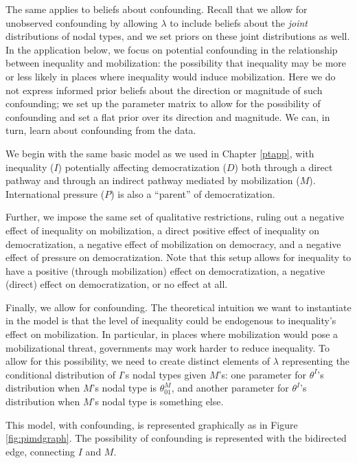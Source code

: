 \documentclass[
  12pt,
]{book}
\begin{document}
The same applies to beliefs about confounding. Recall that we allow for unobserved confounding by allowing \(\lambda\) to include beliefs about the \emph{joint} distributions of nodal types, and we set priors on these joint distributions as well. In the application below, we focus on potential confounding in the relationship between inequality and mobilization: the possibility that inequality may be more or less likely in places where inequality would induce mobilization. Here we do not express informed prior beliefs about the direction or magnitude of such confounding; we set up the parameter matrix to allow for the possibility of confounding and set a flat prior over its direction and magnitude. We can, in turn, learn about confounding from the data.

We begin with the same basic model as we used in Chapter \ref{ptapp}, with inequality (\(I\)) potentially affecting democratization (\(D\)) both through a direct pathway and through an indirect pathway mediated by mobilization (\(M\)). International pressure (\(P\)) is also a ``parent'' of democratization.

Further, we impose the same set of qualitative restrictions, ruling out a negative effect of inequality on mobilization, a direct positive effect of inequality on democratization, a negative effect of mobilization on democracy, and a negative effect of pressure on democratization. Note that this setup allows for inequality to have a positive (through mobilization) effect on democratization, a negative (direct) effect on democratization, or no effect at all.

Finally, we allow for confounding. The theoretical intuition we want to instantiate in the model is that the level of inequality could be endogenous to inequality's effect on mobilization. In particular, in places where mobilization would pose a mobilizational threat, governments may work harder to reduce inequality. To allow for this possibility, we need to create distinct elements of \(\lambda\) representing the conditional distribution of \(I\)'s nodal types given \(M\)'s: one parameter for \(\theta^I\)'s distribution when \(M\)'s nodal type is \(\theta^M_{01}\), and another parameter for \(\theta^I\)'s distribution when \(M\)'s nodal type is something else.

This model, with confounding, is represented graphically as in Figure \ref{fig:pimdgraph}. The possibility of confounding is represented with the bidirected edge, connecting \(I\) and \(M\).
\end{document}

